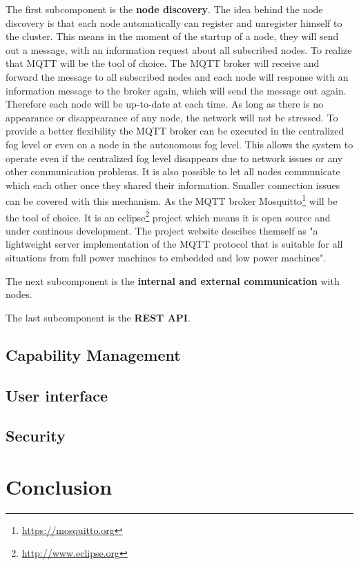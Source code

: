 The first subcomponent is the \textbf{node discovery}.
The idea behind the node discovery is that each node automatically can register and unregister himself to the cluster.
This means in the moment of the startup of a node, they will send out a message, with an information request about all subscribed nodes.
To realize that \ac{MQTT} will be the tool of choice.
The \ac{MQTT} broker will receive and forward the message to all subscribed nodes and each node will response with an information message to the broker again, which will send the message out again.
Therefore each node will be up-to-date at each time.
As long as there is no appearance or disappearance of any node, the network will not be stressed.
To provide a better flexibility the \ac{MQTT} broker can be executed in the centralized fog level or even on a node in the autonomous fog level.
This allows the system to operate even if the centralized fog level disappears due to network issues or any other communication problems.
It is also possible to let all nodes communicate which each other once they shared their information.
Smaller connection issues can be covered with this mechanism.
As the \ac{MQTT} broker Mosquitto\footnote{\url{https://mosquitto.org}} will be the tool of choice.
It is an eclipse\footnote{\url{http://www.eclipse.org}} project which means it is open source and under continous development.
The project website descibes themself as "a lightweight server implementation of the MQTT protocol that is suitable for all situations from full power machines to embedded and low power machines"\autocite{Eclipse:Mosquitto}.

The next subcomponent is the \textbf{internal and external communication} with nodes.


The last subcomponent is the \textbf{\ac{REST} \ac{API}}.
\doit

\subsection{Capability Management}
\doit

\subsection{User interface}
\doit

\subsection{Security}
\doit

\section{Conclusion}
\doit




